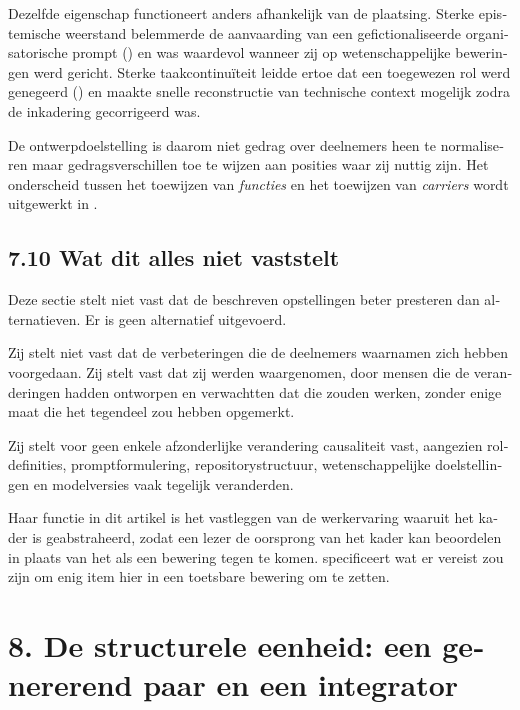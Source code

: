 \begin{dutch}
Dezelfde eigenschap functioneert anders afhankelijk van de plaatsing. Sterke epistemische weerstand belemmerde de aanvaarding van een gefictionaliseerde organisatorische prompt () en was waardevol wanneer zij op wetenschappelijke beweringen werd gericht. Sterke taakcontinuïteit leidde ertoe dat een toegewezen rol werd genegeerd () en maakte snelle reconstructie van technische context mogelijk zodra de inkadering gecorrigeerd was.

De ontwerpdoelstelling is daarom niet gedrag over deelnemers heen te normaliseren maar gedragsverschillen toe te wijzen aan posities waar zij nuttig zijn. Het onderscheid tussen het toewijzen van \emph{functies} en het toewijzen van \emph{carriers} wordt uitgewerkt in .


\subsection*{7.10 Wat dit alles niet vaststelt}
\label{sec:nl:7.10}

Deze sectie stelt niet vast dat de beschreven opstellingen beter presteren dan alternatieven. Er is geen alternatief uitgevoerd.

Zij stelt niet vast dat de verbeteringen die de deelnemers waarnamen zich hebben voorgedaan. Zij stelt vast dat zij werden waargenomen, door mensen die de veranderingen hadden ontworpen en verwachtten dat die zouden werken, zonder enige maat die het tegendeel zou hebben opgemerkt.

Zij stelt voor geen enkele afzonderlijke verandering causaliteit vast, aangezien roldefinities, promptformulering, repositorystructuur, wetenschappelijke doelstellingen en modelversies vaak tegelijk veranderden.

Haar functie in dit artikel is het vastleggen van de werkervaring waaruit het kader is geabstraheerd, zodat een lezer de oorsprong van het kader kan beoordelen in plaats van het als een bewering tegen te komen.  specificeert wat er vereist zou zijn om enig item hier in een toetsbare bewering om te zetten.


\section*{8. De structurele eenheid: een genererend paar en een integrator}
\label{sec:nl:8}


\end{dutch}
